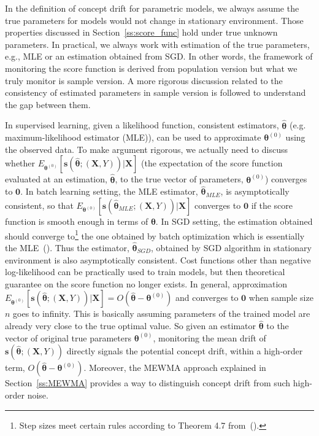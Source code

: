 \documentclass[twoside,11pt]{article}
\begin{document}
In the definition of concept drift for parametric models, we always assume the true parameters for models would not change in stationary environment. Those properties discussed in Section~\ref{ss:score_func} hold under true unknown parameters. In practical, we always work with estimation of the true parameters, e.g., MLE or an estimation obtained from SGD. In other words, the framework of monitoring the score function is derived from population version but what we truly monitor is sample version. A more rigorous discussion related to the consistency of estimated parameters in sample version is followed to understand the gap between them.

In supervised learning, given a likelihood function, consistent estimators, $\hat {\bm {\theta}}$ (e.g. maximum-likelihood estimator (MLE)), can be used to approximate {$\bm { \theta}^{ (0)}$} using the observed data. To make argument rigorous, we actually need to discuss whether $E_{\bm { \theta} ^{ (0)}}[\bm{s}(\hat{\bm { \theta}};(\bm {X}, Y))|\bm {X}]$ (the expectation of the score function evaluated at an estimation, $\hat { \bm { \theta}}$, to the true vector of parameters, $\bm { \theta} ^{ (0)}$) converges to $\bm {0}$. In batch learning setting, the MLE estimator, $\hat { \bm { \theta}}_ {MLE}$, is asymptotically consistent, so that $E_{\bm { \theta} ^{ (0)}}[\bm{s}(\hat{\bm { \theta}} _{MLE};(\bm {X}, Y))|\bm {X}]$ converges to $\bm {0}$ if the score function is smooth enough in terms of $\bm { \theta}$. In SGD setting, the estimation obtained should converge to\footnote{Step sizes meet certain rules according to Theorem 4.7 from~(\cite{bottou2018optimization}).} the one obtained by batch optimization which is essentially the MLE~(\cite{bottou2018optimization}). Thus the estimator, $\hat {\bm { \theta}} _{SGD} $, obtained by SGD algorithm in stationary environment is also asymptotically consistent. Cost functions other than negative log-likelihood can be practically used to train models, but then theoretical guarantee on the score function no longer exists. In general, approximation {$E _{\bm { \theta} ^{ (0)}}[\bm{s}(\hat{\bm { \theta}};(\bm {X}, Y))|\bm{X}] = O (\hat{\bm { \theta}} - \bm { \theta}^{ (0)}) $} and converges to $\bm {0}$ when sample size $n$ goes to infinity. This is basically assuming parameters of the trained model are already very close to the true optimal value. So given an estimator $\hat {\bm { \theta}}$ to the vector of original true parameters $\bm { \theta}^{(0)}$, monitoring the mean {drift} of $\bm{s} (\hat{\bm { \theta}};(\bm {X}, Y))$ directly signals the potential concept drift, within a high-order term, {$O(\hat{\bm { \theta}} - \bm { \theta} ^{ (0)})$.} Moreover, the MEWMA approach explained in Section~\ref{ss:MEWMA} provides a way to distinguish concept drift from such high-order noise.
\end{document}
